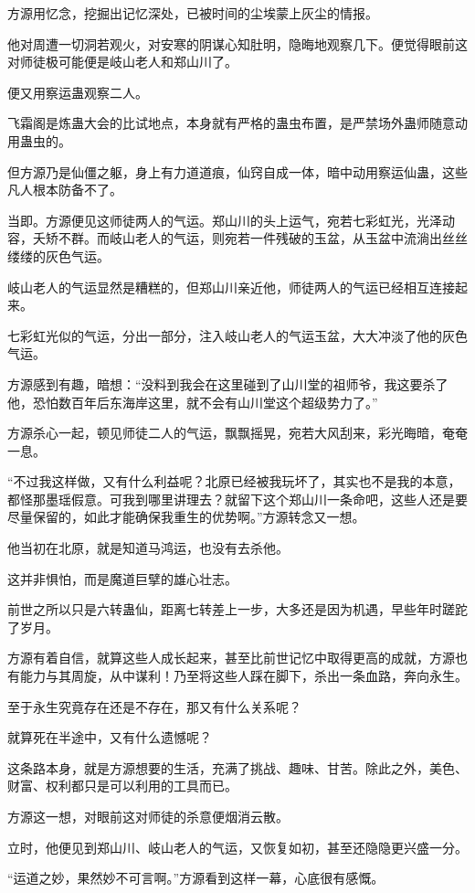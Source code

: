 \begin{this_body}
方源用忆念，挖掘出记忆深处，已被时间的尘埃蒙上灰尘的情报。

他对周遭一切洞若观火，对安寒的阴谋心知肚明，隐晦地观察几下。便觉得眼前这对师徒极可能便是岐山老人和郑山川了。

便又用察运蛊观察二人。

飞霜阁是炼蛊大会的比试地点，本身就有严格的蛊虫布置，是严禁场外蛊师随意动用蛊虫的。

但方源乃是仙僵之躯，身上有力道道痕，仙窍自成一体，暗中动用察运仙蛊，这些凡人根本防备不了。

当即。方源便见这师徒两人的气运。郑山川的头上运气，宛若七彩虹光，光泽动容，夭矫不群。而岐山老人的气运，则宛若一件残破的玉盆，从玉盆中流淌出丝丝缕缕的灰色气运。

岐山老人的气运显然是糟糕的，但郑山川亲近他，师徒两人的气运已经相互连接起来。

七彩虹光似的气运，分出一部分，注入岐山老人的气运玉盆，大大冲淡了他的灰色气运。

方源感到有趣，暗想：“没料到我会在这里碰到了山川堂的祖师爷，我这要杀了他，恐怕数百年后东海岸这里，就不会有山川堂这个超级势力了。”

方源杀心一起，顿见师徒二人的气运，飘飘摇晃，宛若大风刮来，彩光晦暗，奄奄一息。

“不过我这样做，又有什么利益呢？北原已经被我玩坏了，其实也不是我的本意，都怪那墨瑶假意。可我到哪里讲理去？就留下这个郑山川一条命吧，这些人还是要尽量保留的，如此才能确保我重生的优势啊。”方源转念又一想。

他当初在北原，就是知道马鸿运，也没有去杀他。

这并非惧怕，而是魔道巨擘的雄心壮志。

前世之所以只是六转蛊仙，距离七转差上一步，大多还是因为机遇，早些年时蹉跎了岁月。

方源有着自信，就算这些人成长起来，甚至比前世记忆中取得更高的成就，方源也有能力与其周旋，从中谋利！乃至将这些人踩在脚下，杀出一条血路，奔向永生。

至于永生究竟存在还是不存在，那又有什么关系呢？

就算死在半途中，又有什么遗憾呢？

这条路本身，就是方源想要的生活，充满了挑战、趣味、甘苦。除此之外，美色、财富、权利都只是可以利用的工具而已。

方源这一想，对眼前这对师徒的杀意便烟消云散。

立时，他便见到郑山川、岐山老人的气运，又恢复如初，甚至还隐隐更兴盛一分。

“运道之妙，果然妙不可言啊。”方源看到这样一幕，心底很有感慨。


\end{this_body}

